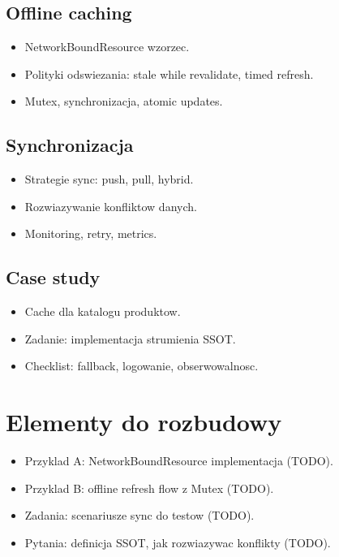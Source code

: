 \subsection{Offline caching}
\begin{itemize}
  \item NetworkBoundResource wzorzec.
  \item Polityki odswiezania: stale while revalidate, timed refresh.
  \item Mutex, synchronizacja, atomic updates.
\end{itemize}

\subsection{Synchronizacja}
\begin{itemize}
  \item Strategie sync: push, pull, hybrid.
  \item Rozwiazywanie konfliktow danych.
  \item Monitoring, retry, metrics.
\end{itemize}

\subsection{Case study}
\begin{itemize}
  \item Cache dla katalogu produktow.
  \item Zadanie: implementacja strumienia SSOT.
  \item Checklist: fallback, logowanie, obserwowalnosc.
\end{itemize}

\section{Elementy do rozbudowy}
\begin{itemize}
  \item Przyklad A: NetworkBoundResource implementacja (TODO).
  \item Przyklad B: offline refresh flow z Mutex (TODO).
  \item Zadania: scenariusze sync do testow (TODO).
  \item Pytania: definicja SSOT, jak rozwiazywac konflikty (TODO).
\end{itemize}



